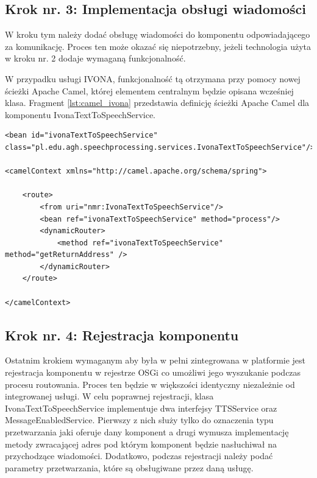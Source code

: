 \subsection {Krok nr. 3: Implementacja obsługi wiadomości}

W kroku tym należy dodać obsługę wiadomości do komponentu odpowiadającego za komunikację. Proces ten może okazać się niepotrzebny, jeżeli technologia użyta w kroku nr. 2 dodaje wymaganą funkcjonalność.

W przypadku usługi IVONA, funkcjonalność tą otrzymana przy pomocy nowej ścieżki Apache Camel, której elementem centralnym będzie opisana wcześniej klasa. Fragment \ref{lst:camel_ivona} przedstawia definicję ścieżki Apache Camel dla komponentu IvonaTextToSpeechService.

\lstset{language=XML, tabsize=4, caption=Ścieżka Apache Camel dla komponentu IvonaTextToSpeechService.,label=lst:camel_ivona}

\begin{center}
\begin{lstlisting}
<bean id="ivonaTextToSpeechService" class="pl.edu.agh.speechprocessing.services.IvonaTextToSpeechService"/>

<camelContext xmlns="http://camel.apache.org/schema/spring">

	<route>
		<from uri="nmr:IvonaTextToSpeechService"/>
		<bean ref="ivonaTextToSpeechService" method="process"/>
		<dynamicRouter>
			<method ref="ivonaTextToSpeechService" method="getReturnAddress" />
		</dynamicRouter>
	</route>

</camelContext>
\end{lstlisting}
\end{center}

\subsection {Krok nr. 4: Rejestracja komponentu}

Ostatnim krokiem wymaganym aby była w pełni zintegrowana w platformie jest rejestracja komponentu w rejestrze OSGi co umożliwi jego wyszukanie podczas procesu routowania. Proces ten będzie w większości identyczny niezależnie od integrowanej usługi.
W celu poprawnej rejestracji, klasa IvonaTextToSpeechService implementuje dwa interfejsy TTSService oraz MessageEnabledService. Pierwszy z nich służy tylko do oznaczenia typu przetwarzania jaki oferuje dany komponent a drugi wymusza implementację metody zwracającej adres pod którym komponent będzie nasłuchiwał na przychodzące wiadomości. Dodatkowo, podczas rejestracji należy podać parametry przetwarzania, które są obsługiwane przez daną usługę.

